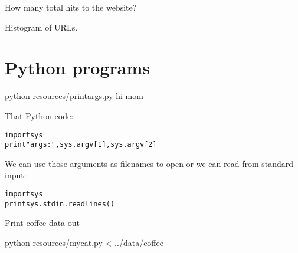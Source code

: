 \begin{fullwidth}
How many total hits to the website? 

Histogram of URLs.

\vspace{5mm}

\section{Python programs}

{\small
\bash[script,stdout,prefix=$]
python resources/printargs.py hi mom
\END
}

That Python code:
 
\begin{alltt}
import sys
print "args:", sys.argv[1], sys.argv[2]
\end{alltt}

We can use those arguments as filenames to open or we can read from standard input:
 
\begin{alltt}
import sys
print sys.stdin.readlines()  
\end{alltt}

Print coffee data out

{\small
\bash[script,stdout,prefix=$]
python resources/mycat.py < ../data/coffee
\END
}

\end{fullwidth}
